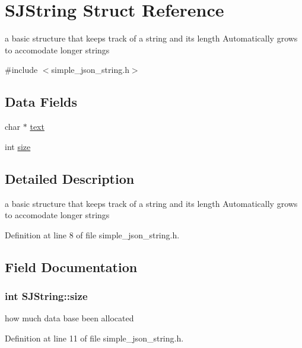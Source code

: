 \hypertarget{structSJString}{}\section{S\+J\+String Struct Reference}
\label{structSJString}


a basic structure that keeps track of a string and its length Automatically grows to accomodate longer strings  




{\ttfamily \#include $<$simple\+\_\+json\+\_\+string.\+h$>$}

\subsection*{Data Fields}
\begin{DoxyCompactItemize}
\item 
char $\ast$ \hyperlink{structSJString_a623eb7be189beccc29815162623ef0ca}{text}
\item 
int \hyperlink{structSJString_aadeb1114b35655389566beaab06d43d5}{size}
\end{DoxyCompactItemize}


\subsection{Detailed Description}
a basic structure that keeps track of a string and its length Automatically grows to accomodate longer strings 

Definition at line 8 of file simple\+\_\+json\+\_\+string.\+h.



\subsection{Field Documentation}
\subsubsection[{\texorpdfstring{size}{size}}]{\setlength{\rightskip}{0pt plus 5cm}int S\+J\+String\+::size}\hypertarget{structSJString_aadeb1114b35655389566beaab06d43d5}{}\label{structSJString_aadeb1114b35655389566beaab06d43d5}
how much data base been allocated 

Definition at line 11 of file simple\+\_\+json\+\_\+string.\+h.

